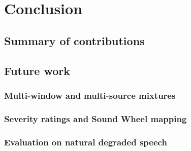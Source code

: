 \chapter{Conclusion} \label{ch:conclusion}

\section{Summary of contributions} \label{sec:conc-summary}

\section{Future work} \label{sec:conc-future}
\subsection{Multi-window and multi-source mixtures}
\subsection{Severity ratings and Sound Wheel mapping}
\subsection{Evaluation on natural degraded speech}
